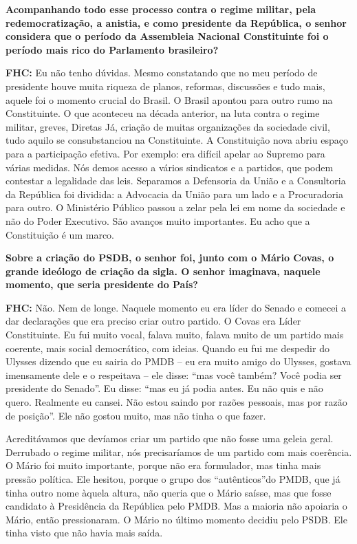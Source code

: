 \textbf{Acompanhando todo esse processo contra o regime militar, pela
redemocratização, a anistia, e como presidente da República, o senhor
considera que o período da Assembleia Nacional Constituinte foi o
período mais rico do Parlamento brasileiro?}

\textbf{FHC:} Eu não tenho dúvidas. Mesmo constatando que no meu período
de presidente houve muita riqueza de planos, reformas, discussões e tudo
mais, aquele foi o momento crucial do Brasil. O Brasil apontou para
outro rumo na Constituinte. O que aconteceu na década anterior, na luta
contra o regime militar, greves, Diretas Já, criação de muitas
organizações da sociedade civil, tudo aquilo se consubstanciou na
Constituinte. A Constituição nova abriu espaço para a participação
efetiva. Por exemplo: era difícil apelar ao Supremo para várias medidas.
Nós demos acesso a vários sindicatos e a partidos, que podem contestar a
legalidade das leis. Separamos a Defensoria da União e a Consultoria da
República foi dividida: a Advocacia da União para um lado e a
Procuradoria para outro. O Ministério Público passou a zelar pela lei em
nome da sociedade e não do Poder Executivo. São avanços muito
importantes. Eu acho que a Constituição é um marco.

\textbf{Sobre a criação do PSDB, o senhor foi, junto com o Mário Covas,
o grande ideólogo de criação da sigla. O senhor imaginava, naquele
momento, que seria presidente do País?}

\textbf{FHC:} Não. Nem de longe. Naquele momento eu era líder do Senado
e comecei a dar declarações que era preciso criar outro partido. O Covas
era Líder Constituinte. Eu fui muito vocal, falava muito, falava muito
de um partido mais coerente, mais social democrático, com ideias. Quando
eu fui me despedir do Ulysses dizendo que eu sairia do PMDB -- eu era
muito amigo do Ulysses, gostava imensamente dele e o respeitava -- ele
disse: ``mas você também? Você podia ser presidente do Senado''. Eu
disse: ``mas eu já podia antes. Eu não quis e não quero. Realmente eu
cansei. Não estou saindo por razões pessoais, mas por razão de
posição''. Ele não gostou muito, mas não tinha o que fazer.

Acreditávamos que devíamos criar um partido que não fosse uma geleia
geral. Derrubado o regime militar, nós precisaríamos de um partido com
mais coerência. O Mário foi muito importante, porque não era formulador,
mas tinha mais pressão política. Ele hesitou, porque o grupo dos
``autênticos''do PMDB, que já tinha outro nome àquela altura, não queria
que o Mário saísse, mas que fosse candidato à Presidência da República
pelo PMDB. Mas a maioria não apoiaria o Mário, então pressionaram. O
Mário no último momento decidiu pelo PSDB. Ele tinha visto que não havia
mais saída.

